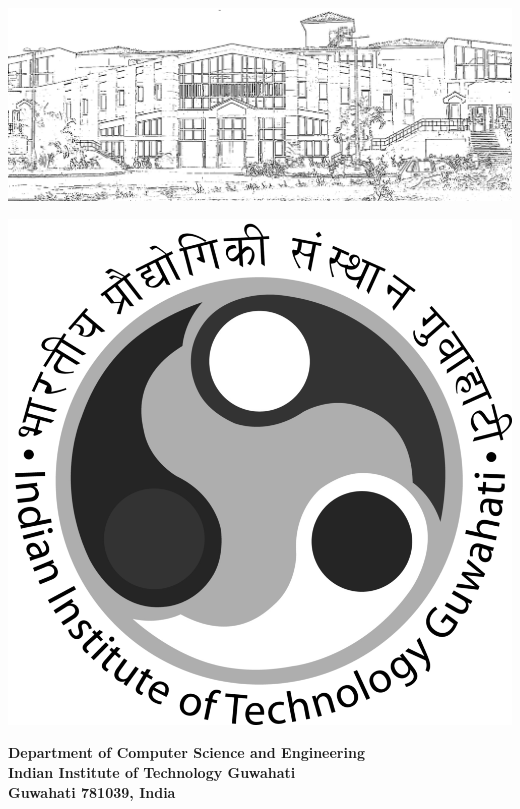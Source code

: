 \chapter*{}
\thispagestyle{empty}
\begin{center}
\vspace{30ex}
\includegraphics[width=\textwidth]{100-back/academic}
\begin{minipage}{0.2\linewidth}
\includegraphics[width=\textwidth]{100-back/IITG_logo.png}
\end{minipage}
\begin{minipage}{0.78\linewidth}
	\begin{flushleft}
    \textbf{Department of Computer Science and Engineering}\\
    \large{\textbf{Indian Institute of Technology Guwahati}}\\
    \Large{\textbf{Guwahati 781039, India}}
	\end{flushleft}
\end{minipage}
\end{center}
